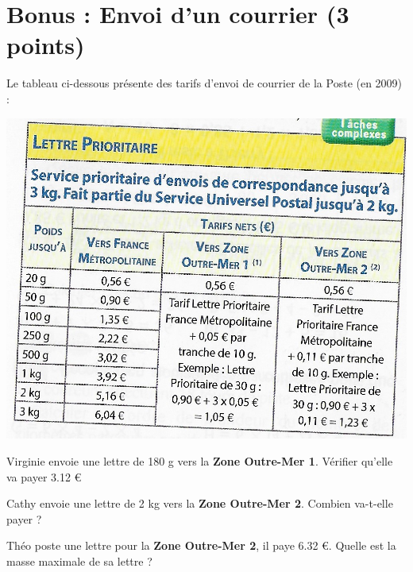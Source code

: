 \section{Bonus : Envoi d'un courrier (3 points)}

Le tableau ci-dessous présente des tarifs d'envoi de courrier de la Poste (en 2009) :

\begin{center}
	\includegraphics[scale=1.1]{img/poste}
\end{center}

\begin{questions}
	\question[1] Virginie envoie une lettre de 180 g vers la \textbf{Zone Outre-Mer 1}. Vérifier qu'elle va payer \num{3.12} €
	
	\question[1] Cathy envoie une lettre de 2 kg vers la \textbf{Zone Outre-Mer 2}. Combien va-t-elle payer ?
	
	\question[1] Théo poste une lettre pour la \textbf{Zone Outre-Mer 2}, il paye \num{6.32} €. Quelle est la masse maximale de sa lettre ?
	

\end{questions}